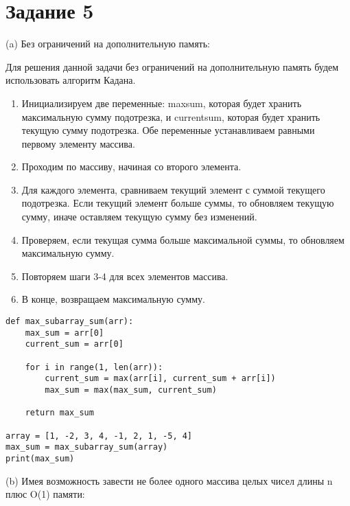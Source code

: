 
\section*{Задание 5}


(a) Без ограничений на дополнительную память:

Для решения данной задачи без ограничений на дополнительную память будем использовать алгоритм Кадана.
\begin{enumerate}
\item Инициализируем две переменные: maxsum, которая будет хранить максимальную сумму подотрезка, и currentsum, которая будет хранить текущую сумму подотрезка. Обе переменные устанавливаем равными первому элементу массива.
\item Проходим по массиву, начиная со второго элемента.
\item Для каждого элемента, сравниваем текущий элемент с суммой текущего подотрезка. Если текущий элемент больше суммы, то обновляем текущую сумму, иначе оставляем текущую сумму без изменений.
\item Проверяем, если текущая сумма больше максимальной суммы, то обновляем максимальную сумму.
\item Повторяем шаги 3-4 для всех элементов массива.
\item В конце, возвращаем максимальную сумму.
\end{enumerate}

\begin{lstlisting}
def max_subarray_sum(arr):
	max_sum = arr[0]
	current_sum = arr[0]

	for i in range(1, len(arr)):
		current_sum = max(arr[i], current_sum + arr[i])
		max_sum = max(max_sum, current_sum)

	return max_sum

array = [1, -2, 3, 4, -1, 2, 1, -5, 4]
max_sum = max_subarray_sum(array)
print(max_sum)
\end{lstlisting}
	
(b) Имея возможность завести не более одного массива целых чисел длины n плюс O(1) памяти:

